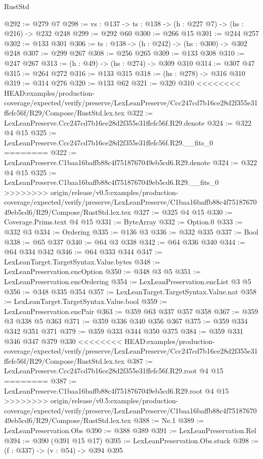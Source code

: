 \begin{lexlean}{RustStd}
\begin{coremodule}
{\begin{coremodule}
@292 := @279 @7
@298 := {vs : @137} -> {ts : @138} -> (h : @227 @7) -> (hs : @216) -> @232 @248
@299 := @292 @60
@300 := @266 @15
@301 := @244 @257
@302 := @133 @301
@306 := {ts : @138} -> (h : @242) -> (hs : @300) -> @302 @248
@307 := @299 @267
@308 := @256 @265
@309 := @133 @308
@310 := @247 @267
@313 := (h : @49) -> (hs : @274) -> @309 @310
@314 := @307 @47
@315 := @264 @272
@316 := @133 @315
@318 := (hs : @278) -> @316 @310
@319 := @314 @276
@320 := @133 @62
@321 := @320 @310
<<<<<<<< HEAD:examples/production-coverage/expected/verify/preserve/LexLeanPreserve/Ccc247cd7b16ce28d2f355e31ffefc56f/R29/Compose/RustStd.lex.tex
@322 := LexLeanPreserve.Ccc247cd7b16ce28d2f355e31ffefc56f.R29.denote
@324 := @322 @4 @15
@325 := LexLeanPreserve.Ccc247cd7b16ce28d2f355e31ffefc56f.R29.__fits_0
========
@322 := LexLeanPreserve.C1baa16baffb88c4f7518767049eb5cd6.R29.denote
@324 := @322 @4 @15
@325 := LexLeanPreserve.C1baa16baffb88c4f7518767049eb5cd6.R29.__fits_0
>>>>>>>> origin/release/v0.5:examples/production-coverage/expected/verify/preserve/LexLeanPreserve/C1baa16baffb88c4f7518767049eb5cd6/R29/Compose/RustStd.lex.tex
@327 := @325 @4 @15
@330 := Coverage.Prims.text @4 @15
@331 := ByteArray
@332 := Option.{0}
@333 := @332 @3
@334 := Ordering
@335 := @136 @3
@336 := @332 @335
@337 := Bool
@338 := @65 @337
@340 := @64 @3 @338
@342 := @64 @336 @340
@344 := @64 @334 @342
@346 := @64 @333 @344
@347 := LexLeanTarget.TargetSyntax.Value.bytes
@348 := LexLeanPreservation.encOption
@350 := @348 @3 @5
@351 := LexLeanPreservation.encOrdering
@354 := LexLeanPreservation.encList @3 @5
@356 := @348 @335 @354
@357 := LexLeanTarget.TargetSyntax.Value.nat
@358 := LexLeanTarget.TargetSyntax.Value.bool
@359 := LexLeanPreservation.encPair
@363 := @359 @63 @337 @357 @358
@367 := @359 @3 @338 @5 @363
@371 := @359 @336 @340 @356 @367
@375 := @359 @334 @342 @351 @371
@379 := @359 @333 @344 @350 @375
@384 := @359 @331 @346 @347 @379 @330
<<<<<<<< HEAD:examples/production-coverage/expected/verify/preserve/LexLeanPreserve/Ccc247cd7b16ce28d2f355e31ffefc56f/R29/Compose/RustStd.lex.tex
@387 := LexLeanPreserve.Ccc247cd7b16ce28d2f355e31ffefc56f.R29.root @4 @15
========
@387 := LexLeanPreserve.C1baa16baffb88c4f7518767049eb5cd6.R29.root @4 @15
>>>>>>>> origin/release/v0.5:examples/production-coverage/expected/verify/preserve/LexLeanPreserve/C1baa16baffb88c4f7518767049eb5cd6/R29/Compose/RustStd.lex.tex
@388 := Ne.{1}
@389 := LexLeanPreservation.Obs
@390 := @388 @389
@391 := LexLeanPreservation.Rel
@394 := @390 (@391 @15 @17)
@395 := LexLeanPreservation.Obs.stuck
@398 := (f : @337) -> (v : @54) -> @394 @395

\end{coremodule}}
\end{coremodule}
\end{lexlean}
